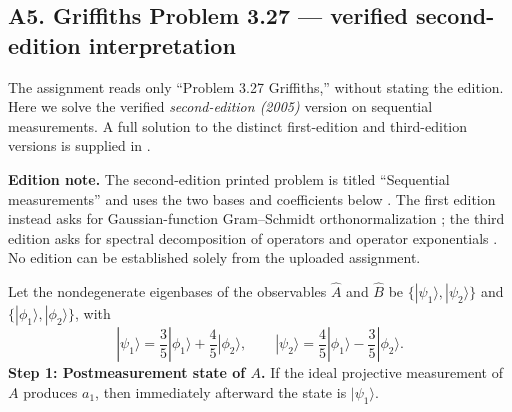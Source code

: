 \documentclass[11pt,a4paper]{article}
\newcommand{\ket}[1]{|#1\rangle}
\begin{document}
\subsection{A5. Griffiths Problem 3.27 --- verified second-edition interpretation}
\begin{questionbox}
The assignment reads only ``Problem 3.27 Griffiths,'' without stating the edition. Here we solve the verified \emph{second-edition (2005)} version on sequential measurements. A full solution to the distinct first-edition and third-edition versions is supplied in .
\end{questionbox}
\textbf{Edition note.} The second-edition printed problem is titled ``Sequential measurements'' and uses the two bases and coefficients below \cite{griffiths2}. The first edition instead asks for Gaussian-function Gram--Schmidt orthonormalization \cite{griffiths1}; the third edition asks for spectral decomposition of operators and operator exponentials \cite{griffiths3}. No edition can be established solely from the uploaded assignment.

Let the nondegenerate eigenbases of the observables $\hat A$ and $\hat B$ be $\{\ket{\psi_1},\ket{\psi_2}\}$ and $\{\ket{\phi_1},\ket{\phi_2}\}$, with
\begin{equation}
\ket{\psi_1}=\frac35\ket{\phi_1}+\frac45\ket{\phi_2},\qquad
\ket{\psi_2}=\frac45\ket{\phi_1}-\frac35\ket{\phi_2}.
\end{equation}
\textbf{Step 1: Postmeasurement state of $A$.} If the ideal projective measurement of $A$ produces $a_1$, then immediately afterward the state is $\boxed{\ket{\psi_1}}$.
\end{document}
